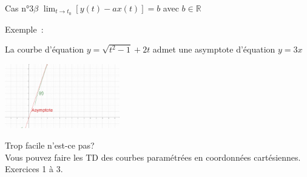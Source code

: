 \documentclass[14pt]{beamer}
\begin{document}
\begin{frame}{Cas n°3$\beta$}
        $\lim_{t\to t_0}\left[y(t)-ax(t)\right]=b$ avec $b\in\mathbb{R}$
        \begin{exampleblock}{Exemple~:}
                \begin{minipage}[b]{5cm}
                        La courbe d'équation $y=\sqrt{t^2-1}+2t$
                        admet une asymptote d'équation $y=3x$
                \end{minipage}
                \includegraphics[width=5cm]{images/Asymptote_03.png}
        \end{exampleblock}
\end{frame}

\begin{frame}{}
        \centering Trop facile n'est-ce pas?\\
        \centering Vous pouvez faire les TD des courbes paramétrées en coordonnées cartésiennes.
        Exercices 1 à 3.
\end{frame}
\end{document}
